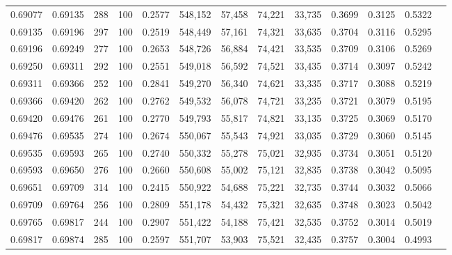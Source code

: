 \begin{tabular}{rrrrrrrrrrrrr}
0.69077 & 0.69135 &   288 & 100 &                                     0.2577 & 548,152 &  57,458 &  74,221 &  33,735 & 0.3699 & 0.3125 & 0.5322 \\
0.69135 & 0.69196 &   297 & 100 &                                     0.2519 & 548,449 &  57,161 &  74,321 &  33,635 & 0.3704 & 0.3116 & 0.5295 \\
0.69196 & 0.69249 &   277 & 100 &                                     0.2653 & 548,726 &  56,884 &  74,421 &  33,535 & 0.3709 & 0.3106 & 0.5269 \\
0.69250 & 0.69311 &   292 & 100 &                                     0.2551 & 549,018 &  56,592 &  74,521 &  33,435 & 0.3714 & 0.3097 & 0.5242 \\
0.69311 & 0.69366 &   252 & 100 &                                     0.2841 & 549,270 &  56,340 &  74,621 &  33,335 & 0.3717 & 0.3088 & 0.5219 \\
0.69366 & 0.69420 &   262 & 100 &                                     0.2762 & 549,532 &  56,078 &  74,721 &  33,235 & 0.3721 & 0.3079 & 0.5195 \\
0.69420 & 0.69476 &   261 & 100 &                                     0.2770 & 549,793 &  55,817 &  74,821 &  33,135 & 0.3725 & 0.3069 & 0.5170 \\
0.69476 & 0.69535 &   274 & 100 &                                     0.2674 & 550,067 &  55,543 &  74,921 &  33,035 & 0.3729 & 0.3060 & 0.5145 \\
0.69535 & 0.69593 &   265 & 100 &                                     0.2740 & 550,332 &  55,278 &  75,021 &  32,935 & 0.3734 & 0.3051 & 0.5120 \\
0.69593 & 0.69650 &   276 & 100 &                                     0.2660 & 550,608 &  55,002 &  75,121 &  32,835 & 0.3738 & 0.3042 & 0.5095 \\
0.69651 & 0.69709 &   314 & 100 &                                     0.2415 & 550,922 &  54,688 &  75,221 &  32,735 & 0.3744 & 0.3032 & 0.5066 \\
0.69709 & 0.69764 &   256 & 100 &                                     0.2809 & 551,178 &  54,432 &  75,321 &  32,635 & 0.3748 & 0.3023 & 0.5042 \\
0.69765 & 0.69817 &   244 & 100 &                                     0.2907 & 551,422 &  54,188 &  75,421 &  32,535 & 0.3752 & 0.3014 & 0.5019 \\
0.69817 & 0.69874 &   285 & 100 &                                     0.2597 & 551,707 &  53,903 &  75,521 &  32,435 & 0.3757 & 0.3004 & 0.4993 \\

\end{tabular}
